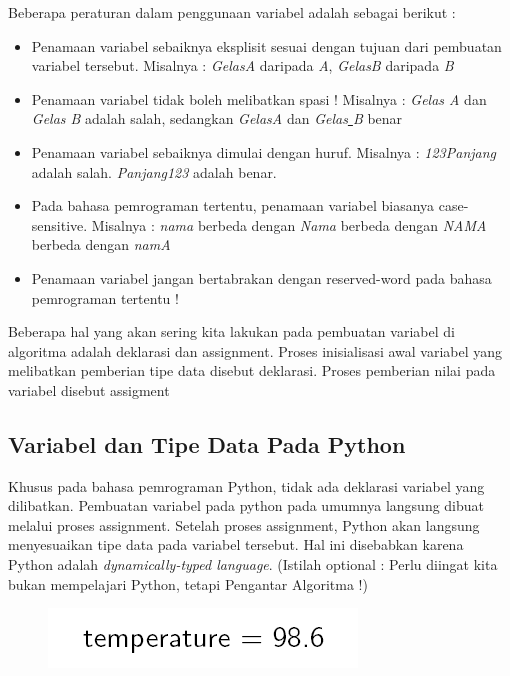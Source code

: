 Beberapa peraturan dalam penggunaan variabel adalah sebagai berikut : 
\begin{itemize}
	\item Penamaan variabel sebaiknya eksplisit sesuai dengan tujuan dari pembuatan variabel tersebut. 			  Misalnya : \textit{GelasA} daripada \textit{A}, \textit{GelasB} daripada \textit{B}
	\item	Penamaan variabel tidak boleh melibatkan spasi !  Misalnya : \textit{Gelas A} dan \textit{Gelas B} adalah salah, sedangkan \textit{GelasA} dan \textit{Gelas\underline{ }B} benar
	\item	Penamaan variabel sebaiknya dimulai dengan huruf. Misalnya : \textit{123Panjang} adalah salah. \textit{Panjang123} adalah benar. 
	\item	Pada bahasa pemrograman tertentu, penamaan variabel biasanya case-sensitive. Misalnya : \textit{nama} berbeda dengan \textit{Nama} berbeda dengan \textit{NAMA} berbeda dengan \textit{namA}
	\item	Penamaan variabel jangan bertabrakan dengan reserved-word pada bahasa pemrograman tertentu !
\end{itemize}
Beberapa hal yang akan sering kita lakukan pada pembuatan variabel di algoritma adalah deklarasi dan assignment. Proses inisialisasi awal variabel yang melibatkan pemberian tipe data disebut deklarasi. Proses pemberian nilai pada variabel disebut assigment 


\subsection{Variabel dan Tipe Data Pada Python}
Khusus pada bahasa pemrograman Python, tidak ada deklarasi variabel yang dilibatkan. Pembuatan variabel pada python pada umumnya langsung dibuat melalui proses assignment. Setelah proses assignment, Python akan langsung menyesuaikan tipe data   pada variabel tersebut. Hal ini disebabkan karena Python adalah \textit{dynamically-typed language}. (Istilah optional : Perlu diingat kita bukan mempelajari Python, tetapi Pengantar Algoritma !)
	\begin{figure}
		\centering
		\includegraphics[scale=0.5]{fig/1/Gambar16.png}	
		\end{figure}

